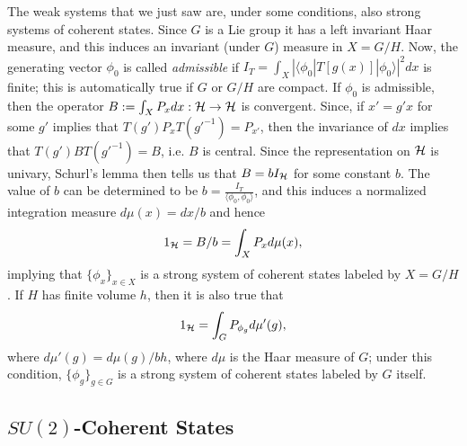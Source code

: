 The weak systems that we just saw are, under some conditions, also strong systems of coherent states. Since $G$ is a Lie group it has a left invariant Haar measure, and this induces an invariant (under $G$) measure in $X = G/H$. Now, the generating vector $\phi_0$ is called \emph{admissible} if $I_T = \int_{X} |\langle \phi_0|T[g(x)] |\phi_0\rangle|^2 dx$ is finite; this is automatically true if $G$ or $G/H$ are compact. If $\phi_0$ is admissible, then the operator $B := \int_X P_x dx : \mathcal H \to \mathcal H$ is convergent. Since, if $x' = g'x$ for some $g'$ implies that $T(g') P_x T(g'^{-1}) = P_{x'}$, then the invariance of $dx$ implies that $T(g') BT(g'^{-1}) = B$, i.e. $B$ is central. Since the representation on $\mathcal H$ is univary, Schurl's lemma then tells us that $B = b I_\mathcal H$ for some constant $b$. The value of $b$ can be determined to be $b = \frac{I_T}{\langle \phi_0, \phi_0 \rangle}$, and this induces a normalized integration measure $d\mu(x) = dx/b$ and hence
\begin{align}
    1_\mathcal H = B/b = \int_X P_x d\mu(x),
\end{align}
implying that $\{\phi_x\}_{x \in X}$ is a strong system of coherent states labeled by $X = G/H$.
If $H$ has finite volume $h$, then it is also true that
\begin{align}
    1_\hcal = \int_G P_{\phi_g} d\mu'(g),
\end{align}
where $d\mu'(g) = d\mu(g)/bh$, where $d\mu$ is the Haar measure of $G$; under this condition, $\{\phi_g\}_{g \in G}$ is a strong system of coherent states labeled by $G$ itself.


\subsection{$SU(2)$-Coherent States}

 




